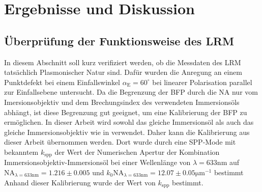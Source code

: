 \documentclass{article}
\begin{document}
\section{Ergebnisse und Diskussion}
	\subsection{Überprüfung der Funktionsweise des LRM}
		In diesem Abschnitt soll kurz verifiziert werden, ob die Messdaten des LRM tatsächlich Plasmonischer Natur sind. Dafür wurden die Anregung an einem Punktdefekt bei einem Einfallswinkel $\alpha_{\mathrm{E}} = 60^\circ$ bei linearer Polarisation parallel zur Einfallsebene untersucht. Da die Begrenzung der BFP durch die NA nur vom Imersionsobjektiv und dem Brechungsindex des verwendeten Immersionsöls abhängt, ist diese Begrenzung gut geeignet, um eine Kalibrierung der BFP zu ermöglichen. In dieser Arbeit wird sowohl das gleiche Immersionsöl als auch das gleiche Immersionsobjektiv wie in\cite{Jaruschewski.2020} verwendet. Daher kann die Kalibrierung aus dieser Arbeit übernommen werden. Dort wurde durch eine SPP-Mode mit bekanntem $k_{\mathrm{spp}}$ der Wert der Numerischen Apertur der Kombination Immersionsobjektiv-Immersionsöl bei einer Wellenlänge von $\lambda=633\mathrm{nm}$ auf $\mathrm{NA}_{\lambda = 633 \mathrm{nm}} = 1.216 \pm 0.005$  und $k_0\mathrm{NA}_{\lambda = 633 \mathrm{nm}} = 12.07 \pm 0.05\mathrm{\mu m}^{-1}$ bestimmt Anhand dieser Kalibrierung wurde der Wert von $k_{\mathrm{spp}}$ bestimmt.
\end{document}
